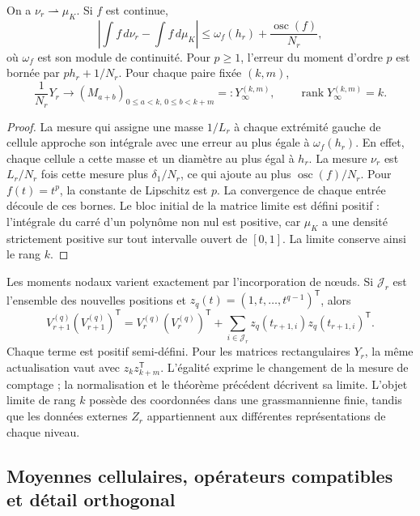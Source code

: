 \begin{theorem}
\label{thm:dim-nodal-limit}
On a \(\nu_r\rightharpoonup\mu_K\). Si \(f\) est continue,
\[
 \left|\int f\,d\nu_r-\int f\,d\mu_K\right|
 \leq \omega_f(h_r)+\frac{\operatorname{osc}(f)}{N_r},
\]
où \(\omega_f\) est son module de continuité. Pour \(p\geq1\), l'erreur du moment d'ordre \(p\) est bornée par \(p h_r+1/N_r\). Pour chaque paire fixée \((k,m)\),
\[
 \frac1{N_r}Y_r\longrightarrow (M_{a+b})_{
     0\leq a<k,\,0\leq b<k+m}=:Y_\infty^{(k,m)},
 \qquad\operatorname{rank}Y_\infty^{(k,m)}=k.
\]
\end{theorem}
\begin{proof}
La mesure qui assigne une masse \(1/L_r\) à chaque extrémité gauche de
cellule approche son intégrale avec une erreur au plus égale à \(\omega_f(h_r)\).
En effet, chaque cellule a cette masse et un diamètre au plus égal à \(h_r\).
La mesure \(\nu_r\) est \(L_r/N_r\) fois cette mesure plus
\(\delta_1/N_r\), ce qui ajoute au plus
\(\operatorname{osc}(f)/N_r\). Pour \(f(t)=t^p\), la constante
de Lipschitz est \(p\). La convergence de chaque entrée découle de
ces bornes. Le bloc initial de la matrice limite est défini positif :
l’intégrale du carré d’un polynôme non nul est positive, car
\(\mu_K\) a une densité strictement positive sur tout intervalle
ouvert de \([0,1]\). La limite conserve ainsi le rang \(k\).
\end{proof}

Les moments nodaux varient exactement par l'incorporation de nœuds. Si \(\mathcal J_r\) est l'ensemble des nouvelles positions et \(z_q(t)=(1,t,\ldots,t^{q-1})^{\mathsf T}\), alors
\[
 V_{r+1}^{(q)}(V_{r+1}^{(q)})^{\mathsf T}
 =V_r^{(q)}(V_r^{(q)})^{\mathsf T}
  +\sum_{i\in\mathcal J_r}z_q(t_{r+1,i})z_q(t_{r+1,i})^{\mathsf T}.
\]
Chaque terme est positif semi-défini. Pour les matrices rectangulaires \(Y_r\), la même actualisation vaut avec \(z_kz_{k+m}^{\mathsf T}\). L'égalité exprime le changement de la mesure de comptage ; la normalisation et le théorème précédent décrivent sa limite. L'objet limite de rang \(k\) possède des coordonnées dans une grassmannienne finie, tandis que les données externes \(Z_r\) appartiennent aux différentes représentations de chaque niveau.

\subsection{Moyennes cellulaires, opérateurs compatibles et détail orthogonal}

